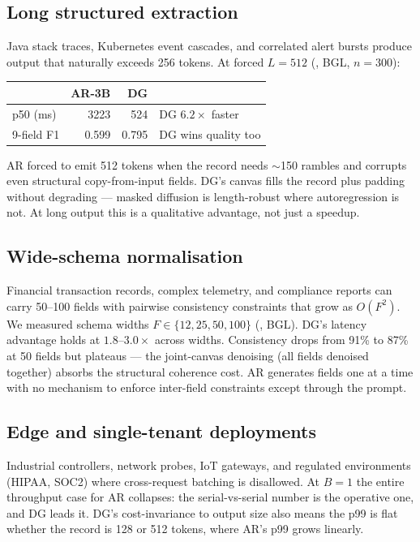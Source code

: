 \subsection{Long structured extraction}

Java stack traces, Kubernetes event cascades, and correlated alert bursts
produce output that naturally exceeds 256 tokens. At forced $L{=}512$
(, BGL, $n{=}300$):

\begin{center}
\begin{tabular}{@{}lrrl@{}}
\toprule
 & AR-3B & DG & \\
\midrule
p50 (ms)    & 3223 & 524  & DG $6.2\times$ faster \\
9-field F1  & 0.599 & 0.795 & DG wins quality too \\
\bottomrule
\end{tabular}
\end{center}

AR forced to emit 512 tokens when the record needs $\sim$150 rambles and
corrupts even structural copy-from-input fields. DG's canvas fills the
record plus padding without degrading --- masked diffusion is
length-robust where autoregression is not. At long output this is a
qualitative advantage, not just a speedup.

\subsection{Wide-schema normalisation}

Financial transaction records, complex telemetry, and compliance reports
can carry 50--100 fields with pairwise consistency constraints that grow
as $O(F^2)$. We measured schema widths $F \in \{12, 25, 50, 100\}$
(, BGL). DG's latency
advantage holds at $1.8$--$3.0\times$ across widths. Consistency drops
from 91\% to 87\% at 50 fields but plateaus --- the joint-canvas
denoising (all fields denoised together) absorbs the structural coherence
cost. AR generates fields one at a time with no mechanism to enforce
inter-field constraints except through the prompt.

\subsection{Edge and single-tenant deployments}

Industrial controllers, network probes, IoT gateways, and regulated
environments (HIPAA, SOC2) where cross-request batching is disallowed.
At $B{=}1$ the entire throughput case for AR collapses: the serial-vs-serial
number is the operative one, and DG leads it. DG's cost-invariance to
output size also means the p99 is flat whether the record is 128 or 512
tokens, where AR's p99 grows linearly.

